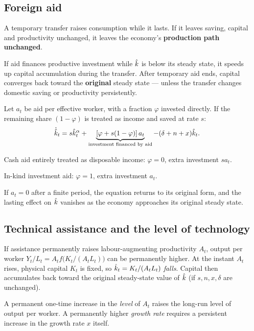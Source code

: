 \documentclass[11pt]{article}
\begin{document}
\subsection{Foreign aid}
A temporary transfer raises consumption while it lasts. If it leaves saving, capital and productivity unchanged, it leaves the economy's \textbf{production path unchanged}.

If aid finances productive investment while $\hat{k}$ is below its steady state, it speeds up capital accumulation during the transfer. After temporary aid ends, capital converges back toward the \textbf{original} steady state --- unless the transfer changes domestic saving or productivity persistently.

Let $a_t$ be aid per effective worker, with a fraction $\varphi$ invested directly. If the remaining share $(1-\varphi)$ is treated as income and saved at rate $s$:
\[
\dot{\hat{k}}_t = s\hat{k}_t^{\alpha} + \underbrace{[\varphi + s(1-\varphi)]\,a_t}_{\text{investment financed by aid}} - (\delta+n+x)\hat{k}_t.
\]
\begin{flatlist}
  \item Cash aid entirely treated as disposable income: $\varphi = 0$, extra investment $sa_t$.
  \item In-kind investment aid: $\varphi = 1$, extra investment $a_t$.
  \item If $a_t = 0$ after a finite period, the equation returns to its original form, and the lasting effect on $\hat{k}$ vanishes as the economy approaches its original steady state.
\end{flatlist}

\subsection{Technical assistance and the level of technology}
If assistance permanently raises labour-augmenting productivity $A_t$, output per worker $Y_t/L_t = A_tf\big(K_t/(A_tL_t)\big)$ can be permanently higher. At the instant $A_t$ rises, physical capital $K_t$ is fixed, so $\hat{k}_t = K_t/(A_tL_t)$ \emph{falls}. Capital then accumulates back toward the original steady-state value of $\hat{k}$ (if $s, n, x, \delta$ are unchanged).

\begin{keyresult}
A permanent one-time increase in the \emph{level} of $A_t$ raises the long-run level of output per worker. A permanently higher \emph{growth rate} requires a persistent increase in the growth rate $x$ itself.
\end{keyresult}
\end{document}
